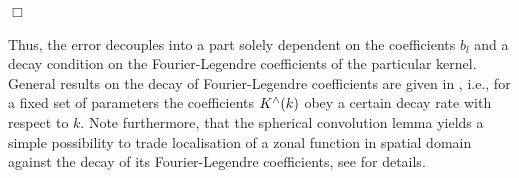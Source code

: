 \documentclass[11pt,a4paper,twoside,bibtotoc]{scrartcl}
\theoremstyle{plain}
\theoremstyle{definition}
\theoremstyle{remark}
\newenvironment{proof}{{\bf Proof.}}{$\Box$}
\newcommand{\abs}[1]{\ensuremath{\left\vert#1\right\vert}}
\newcommand{\fun}[2]{\ensuremath{#1{\hspace{-0.4ex}}\left(#2\right)}}
\newcommand{\mb}[1]{\mathbf{#1}}
\newcommand{\V}[1]{\mb{#1}}
\newcommand{\dx}{\text{\rm{d}}}
\numberwithin{equation}{section}
\numberwithin{table}{section}
\numberwithin{figure}{section}
\begin{document}
\begin{proof}
\end{proof}

Thus, the error decouples into a part solely dependent on the coefficients
$b_l$ and a decay condition on the Fourier-Legendre coefficients of the
particular kernel.
General results on the decay of Fourier-Legendre coefficients are given in
\cite{Sc97,bahu01,CaFi}, i.e., for a fixed set of parameters the coefficients
$\fun{K^{\wedge}}{k}$ obey a certain decay rate with respect to $k$.
Note furthermore, that the spherical convolution lemma yields a simple
possibility to trade localisation of a zonal function in spatial domain
against the decay of its Fourier-Legendre coefficients, see \cite{Sc97} for
details.
\end{document}
